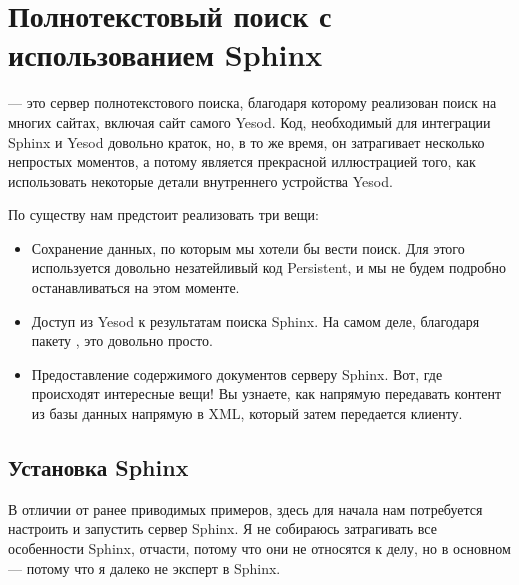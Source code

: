\chapter{Полнотекстовый поиск с использованием Sphinx}\label{chap:sphinx} %

 --- это сервер полнотекстового поиска, благодаря которому реализован поиск на многих сайтах, включая сайт самого Yesod. Код, необходимый для интеграции Sphinx и Yesod довольно краток, но, в то же время, он затрагивает несколько непростых моментов, а потому является прекрасной иллюстрацией того, как использовать некоторые детали внутреннего устройства Yesod. %

По существу нам предстоит реализовать три вещи: %

\begin{itemize}
  \item Сохранение данных, по которым мы хотели бы вести поиск. Для этого используется довольно незатейливый код Persistent, и мы не будем подробно останавливаться на этом моменте. %
  \item Доступ из Yesod к результатам поиска Sphinx. На самом деле, благодаря пакету , это довольно просто.
  \item Предоставление содержимого документов серверу Sphinx. Вот, где происходят интересные вещи! Вы узнаете, как напрямую передавать контент из базы данных напрямую в XML, который затем передается клиенту. %
\end{itemize}

\section{Установка Sphinx} %

В отличии от ранее приводимых примеров, здесь для начала нам потребуется настроить и запустить сервер Sphinx. Я не собираюсь затрагивать все особенности Sphinx, отчасти, потому что они не относятся к делу, но в основном --- потому что я далеко не эксперт в Sphinx.

